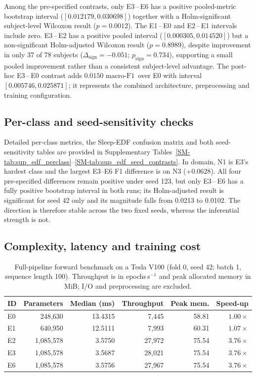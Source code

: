 \documentclass[11pt,a4paper]{article}
\newcommand{\mf}{\ensuremath{\mathrm{macro\text{-}F1}}}
\newcommand{\dsign}{\ensuremath{\Delta_{\mathrm{sign}}}}
\begin{document}
Among the pre-specified contrasts, only E3\,--\,E6 has a positive pooled-metric bootstrap interval
($[0.012179, 0.030698]$) together with a Holm-significant subject-level Wilcoxon result
($p=0.0012$). The
E1\,--\,E0 and E2\,--\,E1 intervals include zero. E3\,--\,E2 has a positive pooled interval
($[0.000305, 0.014520]$) but a non-significant Holm-adjusted Wilcoxon result ($p=0.8989$), despite improvement in
only 37 of 78 subjects ($\dsign=-0.051$; $p_{\mathrm{sign}}=0.734$), supporting a small pooled
improvement rather than a consistent subject-level advantage. The post-hoc E3\,--\,E0 contrast adds
$0.0150$ \mf\ over E0 with interval $[0.005746, 0.025871]$; it represents the combined architecture,
preprocessing and training configuration.

\subsection{Per-class and seed-sensitivity checks}

Detailed per-class metrics, the Sleep-EDF confusion matrix and both seed-sensitivity tables are provided
in Supplementary Tables~\ref{SM-tab:sup_edf_perclass}--\ref{SM-tab:sup_edf_seed_contrasts}.
In domain, N1 is E3's hardest class and the largest E3--E6 F1
difference is on N3 ($+0.0628$). All four pre-specified differences remain positive under seed 123, but
only E3\,--\,E6 has a fully positive bootstrap interval in both runs; its Holm-adjusted result is
significant for seed 42 only and its magnitude falls from 0.0213 to 0.0102. The direction is therefore
stable across the two fixed seeds, whereas the inferential strength is not.

\FloatBarrier
\subsection{Complexity, latency and training cost}

\begin{table}[H]
\centering
\caption{Full-pipeline forward benchmark on a Tesla V100 (fold 0, seed 42; batch 1, sequence length
100). Throughput is in epochs\,s$^{-1}$ and peak allocated memory in MiB; I/O and preprocessing are
excluded.}
\label{tab:complexity}
\small
\begin{tabular}{lrrrrr}
\toprule
\textbf{ID} & \textbf{Parameters} & \textbf{Median (ms)} & \textbf{Throughput} & \textbf{Peak mem.} & \textbf{Speed-up} \\
\midrule
E0 & 248{,}630 & 13.4315 & 7{,}445 & 58.81 & $1.00\times$ \\
E1 & 640{,}950 & 12.5111 & 7{,}993 & 60.31 & $1.07\times$ \\
E2 & 1{,}085{,}578 & 3.5750 & 27{,}972 & 75.54 & $3.76\times$ \\
E3 & 1{,}085{,}578 & 3.5687 & 28{,}021 & 75.54 & $3.76\times$ \\
E6 & 1{,}085{,}578 & 3.5756 & 27{,}967 & 75.54 & $3.76\times$ \\
\bottomrule
\end{tabular}
\end{table}
\end{document}
